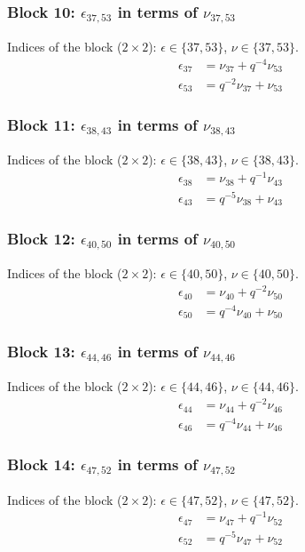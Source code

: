 \subsubsection{Block 10: $\epsilon_{37, 53}$ in terms of $\nu_{37, 53}$}
Indices of the block ($2\times 2$): $\epsilon \in \{37, 53\}$, $\nu \in \{37, 53\}$.
\begin{align*}
\epsilon_{37} &= \nu_{37} + q^{-4}\nu_{53}\\
\epsilon_{53} &= q^{-2}\nu_{37} + \nu_{53}
\end{align*}

\subsubsection{Block 11: $\epsilon_{38, 43}$ in terms of $\nu_{38, 43}$}
Indices of the block ($2\times 2$): $\epsilon \in \{38, 43\}$, $\nu \in \{38, 43\}$.
\begin{align*}
\epsilon_{38} &= \nu_{38} + q^{-1}\nu_{43}\\
\epsilon_{43} &= q^{-5}\nu_{38} + \nu_{43}
\end{align*}

\subsubsection{Block 12: $\epsilon_{40, 50}$ in terms of $\nu_{40, 50}$}
Indices of the block ($2\times 2$): $\epsilon \in \{40, 50\}$, $\nu \in \{40, 50\}$.
\begin{align*}
\epsilon_{40} &= \nu_{40} + q^{-2}\nu_{50}\\
\epsilon_{50} &= q^{-4}\nu_{40} + \nu_{50}
\end{align*}

\subsubsection{Block 13: $\epsilon_{44, 46}$ in terms of $\nu_{44, 46}$}
Indices of the block ($2\times 2$): $\epsilon \in \{44, 46\}$, $\nu \in \{44, 46\}$.
\begin{align*}
\epsilon_{44} &= \nu_{44} + q^{-2}\nu_{46}\\
\epsilon_{46} &= q^{-4}\nu_{44} + \nu_{46}
\end{align*}

\subsubsection{Block 14: $\epsilon_{47, 52}$ in terms of $\nu_{47, 52}$}
Indices of the block ($2\times 2$): $\epsilon \in \{47, 52\}$, $\nu \in \{47, 52\}$.
\begin{align*}
\epsilon_{47} &= \nu_{47} + q^{-1}\nu_{52}\\
\epsilon_{52} &= q^{-5}\nu_{47} + \nu_{52}
\end{align*}

